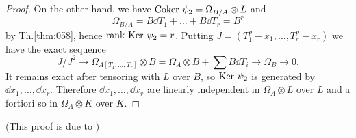 \documentclass[../main]{subfiles}
\begin{document}
\begin{proof}
On the other hand, we have $\operatorname{Coker} \, \psi_2 = \Omega_{B/A} \otimes L$ and \[\Omega_{B/A} = B \dd T_1 + \ldots + B \dd T_r = B^r\] by Th.\ref{thm:058}, hence $\operatorname{rank} \, \operatorname{Ker} \, \psi_2 = r$. Putting $J = (T_1^p - x_1, \ldots, T_r^p - x_r)$ we have the exact sequence \[J/J^2 \longrightarrow \Omega_{A[T_1, \ldots, T_r]} \otimes B = \Omega_A \otimes B + \sum B \dd T_i \longrightarrow \Omega_B \longrightarrow 0.\] It remains exact after tensoring with $L$ over $B$, so $\operatorname{Ker} \, \psi_2$ is generated by $\dd x_1, \ldots, \dd x_r$. Therefore $\dd x_1, \ldots, \dd x_r$ are linearly independent in $\Omega_A \otimes L$ over $L$ and a fortiori so in $\Omega_A \otimes K$ over $K$. 
\end{proof}

(This proof is due to \cite{faltings1978Ein})
\end{document}

